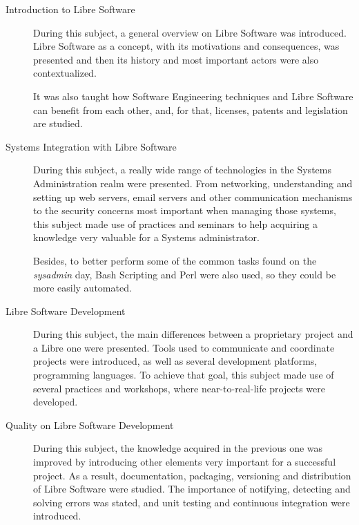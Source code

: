 \begin{description}

\item[Introduction to Libre Software]

During this subject, a general overview on Libre Software was introduced. Libre Software as a concept,
with its motivations and consequences, was presented and then its history and most important actors
were also contextualized.

It was also taught how Software Engineering techniques and Libre Software can benefit from each other,
and, for that, licenses, patents and legislation are studied.

\item[Systems Integration with Libre Software]

During this subject, a really wide range of technologies in the Systems Administration realm were presented.
From networking, understanding and setting up web servers, email servers and other communication mechanisms
to the security concerns most important when managing those systems, this subject made use of practices and
seminars to help acquiring a knowledge very valuable for a Systems administrator.

Besides, to better perform some of the common tasks found on the {\it sysadmin} day, Bash Scripting and Perl were also
used, so they could be more easily automated.

\item[Libre Software Development]

During this subject, the main differences between a proprietary project and a Libre one were presented. Tools used
to communicate and coordinate projects were introduced, as well as several development platforms,
programming languages. To achieve that goal, this subject made use of several practices and workshops, where
near-to-real-life projects were developed.

\item[Quality on Libre Software Development]

During this subject, the knowledge acquired in the previous one was improved by introducing other elements very
important for a successful project. As a result, documentation, packaging, versioning and distribution of Libre Software
were studied. The importance of notifying, detecting and solving errors was stated, and unit testing and continuous
integration were introduced.



\end{description}
